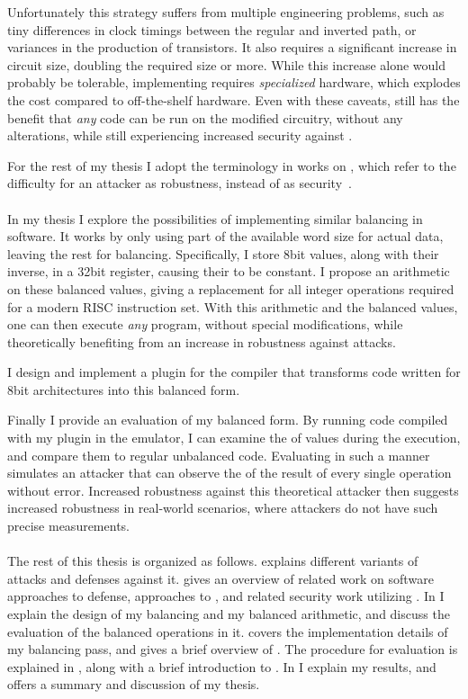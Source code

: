 Unfortunately this strategy suffers from multiple engineering problems, such as tiny differences in clock timings between the regular and inverted path\cite{baddam2008path}, or variances in the production of transistors\cite{razafindraibe2006formal}.
It also requires a significant increase in circuit size, doubling the required size or more\cite{baddam2008path}.
While this increase alone would probably be tolerable, implementing \dual{} requires \emph{specialized} hardware, which explodes the cost compared to off-the-shelf hardware.
Even with these caveats, \dual{} still has the benefit that \emph{any} code can be run on the modified circuitry, without any alterations, while still experiencing increased security against \poweranalysis{}.

For the rest of my thesis I adopt the terminology in works on \dual{}, which refer to the difficulty for an attacker as robustness, instead of as security~\cite{soares2008evaluating,razafindraibe2006formal}.
\\
\\
In my thesis I explore the possibilities of implementing similar balancing in software.
It works by only using part of the available word size for actual data, leaving the rest for balancing.
Specifically, I store 8bit values, along with their inverse, in a 32bit register, causing their \hammingw{} to be constant.
I propose an arithmetic on these balanced values, giving a replacement for all integer operations required for a modern RISC instruction set.
With this arithmetic and the balanced values, one can then execute \emph{any} program, without special modifications, while theoretically benefiting from an increase in robustness against \poweranalysis{} attacks.

I design and implement a plugin for the \llvm{} compiler that transforms code written for 8bit architectures into this balanced form.


Finally I provide an evaluation of my balanced form.
By running code compiled with my plugin in the \qemu{} emulator, I can examine the \hammingw{} of values during the execution, and compare them to regular unbalanced code.
Evaluating in such a manner simulates an attacker that can observe the \hammingw{} of the result of every single operation without error.
Increased robustness against this theoretical attacker then suggests increased robustness in real-world scenarios, where attackers do not have such precise measurements.
\\
\\
The rest of this thesis is organized as follows.
 explains different variants of \poweranalysis{} attacks and defenses against it.
 gives an overview of related work on software approaches to \poweranalysis{} defense, approaches to \dual{}, and related security work utilizing \llvm{}.
In  I explain the design of my balancing and my balanced arithmetic, and discuss the evaluation of the balanced operations in it.
 covers the implementation details of my balancing pass, and gives a brief overview of \llvm{}.
The procedure for evaluation is explained in , along with a brief introduction to \qemu{}.
In  I explain my results, and  offers a summary and discussion of my thesis.

